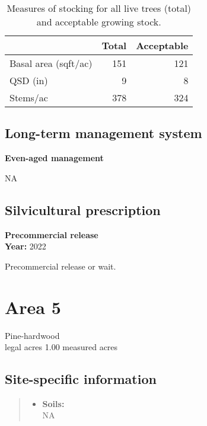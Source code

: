 \documentclass[]{tufte-handout}
\providecommand{\tightlist}{%
  \setlength{\itemsep}{0pt}\setlength{\parskip}{0pt}}
\begin{document}
\begin{table}

\caption{\label{tab:unnamed-chunk-21}Measures of stocking for all live trees (total) and acceptable growing stock.}
\centering
\begin{tabular}[t]{lrr}
\toprule
  & Total & Acceptable\\
\midrule
Basal area (sqft/ac) & 151 & 121\\
QSD (in) & 9 & 8\\
Stems/ac & 378 & 324\\
\bottomrule
\end{tabular}
\end{table}

\subsection{Long-term management
system}\label{long-term-management-system-3}

\textbf{Even-aged management}

NA

\subsection{Silvicultural
prescription}\label{silvicultural-prescription-3}

\textbf{Precommercial release}\\
\noindent \textbf{Year:} 2022

Precommercial release or wait.

\newpage

\section{Area 5}\label{area-5}

Pine-hardwood\\
 legal acres \textbar{} 1.00 measured acres

\subsection{Site-specific
information}\label{site-specific-information-4}

\begin{quote}
\begin{itemize}
\tightlist
\item
  \textbf{Soils:}\\
  \indent\indent  NA
\end{itemize}
\end{quote}
\end{document}
